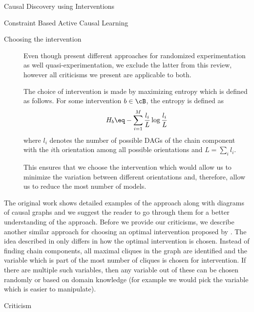 \documentclass[10pt]{article}
\begin{document}
\begin{psection}[4]{Causal Discovery using Interventions}
\begin{psubsection}{Constraint Based Active Causal Learning}
\begin{description}
            \item[Choosing the intervention] 
                Even though \citet{he2008active} present different approaches for
                randomized experimentation as well quasi-experimentation, we exclude the
                latter from this review, however all criticisms we present are
                applicable to both.
        
                The choice of intervention is made by maximizing entropy which is
                defined as follows. For some intervention $b \in \cB$, the entropy is
                defined as
                \begin{align*}
                    H_b \eq - \sum_{i = 1}^M \frac{l_i}{L} \log\frac{l_i}{L}
                \end{align*}
                where $l_i$ denotes the number of possible DAGs of the chain component
                with the $i$th orientation among all possible orientations and
                $L =\sum_{i} l_i$.
        
                This ensures that we choose the intervention which would allow us to
                minimize the variation between different orientations and, therefore,
                allow us to reduce the most number of models.
        \end{description}
        
        The original work shows detailed examples of the approach along with diagrams of
        causal graphs and we suggest the reader to go through them for a better
        understanding of the approach. Before we provide our criticisms, we describe
        another similar approach for choosing an optimal intervention proposed by
        \citet{eberhardt2012}. The idea described in \citep{eberhardt2012} only differs
        in how the optimal intervention is chosen. Instead of finding chain components,
        all maximal cliques in the graph are identified and the variable which is part
        of the most number of cliques is chosen for intervention. If there are multiple
        such variables, then any variable out of these can be chosen randomly or based
        on domain knowledge (for example we would pick the variable which is easier to
        manipulate).

        \begin{pssubsection}{Criticism}
        

\end{pssubsection}
\end{psubsection}
\end{psection}
\end{document}
